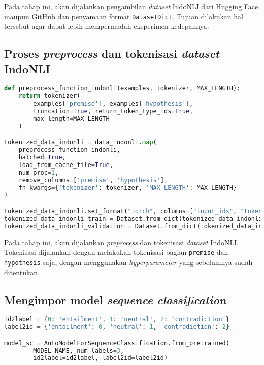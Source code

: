 Pada tahap ini, akan dijalankan pengambilan \emph{dataset} IndoNLI dari Hugging Face maupun GitHub dan penyamaan format \texttt{DatasetDict}. Tujuan dilakukan hal tersebut agar dapat lebih mempermudah eksperimen kedepannya.

\subsection{Proses \emph{preprocess} dan tokenisasi \emph{dataset} IndoNLI}
\begin{lstlisting}[language=Python, caption=Proses \emph{preprocess} dan tokenisasi \emph{dataset} IndoNLI]
def preprocess_function_indonli(examples, tokenizer, MAX_LENGTH):
    return tokenizer(
        examples['premise'], examples['hypothesis'],
        truncation=True, return_token_type_ids=True,
        max_length=MAX_LENGTH
    )

tokenized_data_indonli = data_indonli.map(
    preprocess_function_indonli,
    batched=True,
    load_from_cache_file=True,
    num_proc=1,
    remove_columns=['premise', 'hypothesis'],
    fn_kwargs={'tokenizer': tokenizer, 'MAX_LENGTH': MAX_LENGTH}
)

tokenized_data_indonli.set_format("torch", columns=["input_ids", "token_type_ids"], output_all_columns=True, device=device)
tokenized_data_indonli_train = Dataset.from_dict(tokenized_data_indonli["train"][:SAMPLE])
tokenized_data_indonli_validation = Dataset.from_dict(tokenized_data_indonli["validation"][:SAMPLE])
\end{lstlisting}

Pada tahap ini, akan dijalankan  \emph{preprocess} dan tokenisasi \emph{dataset} IndoNLI. Tokenisasi dijalankan dengan melakukan tokenisasi bagian \texttt{premise} dan \texttt{hypothesis} saja, dengan menggunakan \emph{hyperparameter} yang sebelumnya sudah ditentukan.

\subsection{Mengimpor model \emph{sequence classification}}
\begin{lstlisting}[language=Python, caption=Mengimpor model \emph{sequence classification}]
id2label = {0: 'entailment', 1: 'neutral', 2: 'contradiction'}
label2id = {'entailment': 0, 'neutral': 1, 'contradiction': 2}

model_sc = AutoModelForSequenceClassification.from_pretrained(
        MODEL_NAME, num_labels=3, 
        id2label=id2label, label2id=label2id)
\end{lstlisting}

